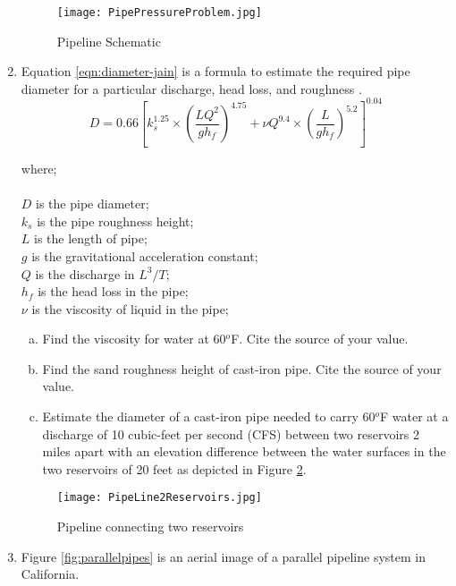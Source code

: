 \documentclass[12pt]{article}
\newcommand\tab[1][1cm]{\hspace*{#1}}
\begin{document}
\begin{enumerate}
\begin{figure}[htbp] %
   \centering
   \texttt{[image: PipePressureProblem.jpg]} 
   \caption{Pipeline Schematic}
   \label{fig:PipePressureProblem}
\end{figure}
\clearpage
\item 
Equation \ref{eqn:diameter-jain} is a formula to estimate the required pipe diameter for a particular discharge, head loss, and roughness \citep{jain1976}.
\begin{equation}
D=0.66[k_s^{1.25}\times(\frac{LQ^2}{gh_f})^{4.75}+\nu Q^{9.4}\times(\frac{L}{gh_f})^{5.2}]^{0.04}
\label{eqn:diameter-jain}
\end{equation}

where;\\~\\
\tab $D$ is the pipe diameter; \\
\tab $k_s$ is the pipe roughness height; \\
\tab $L$ is the length of pipe; \\
\tab $g$ is the gravitational acceleration constant; \\
\tab $Q$ is the discharge in $L^3/T$;\\
\tab $h_f$ is the head loss in the pipe; \\
\tab $\nu$ is the viscosity of liquid in the pipe; \\ 

\begin{enumerate}[(a)]
\item Find the viscosity for water at 60$^o$F.  Cite the source of your value.
\item Find the sand roughness height of cast-iron pipe.  Cite the source of your value. 
\item Estimate the diameter of a cast-iron pipe needed to carry 60$^o$F water at a discharge of 10 cubic-feet per second (CFS) between two reservoirs 2 miles apart with an elevation difference between the water surfaces in the two reservoirs of 20 feet as depicted in Figure \ref{fig:PipeLine2Reservoirs}.
\end{enumerate}

\begin{figure}[htbp] %
   \centering
   \texttt{[image: PipeLine2Reservoirs.jpg]} 
   \caption{Pipeline connecting two reservoirs}
   \label{fig:PipeLine2Reservoirs}
\end{figure}
\clearpage
\item Figure \ref{fig:parallelpipes} is an aerial image of a parallel pipeline system in California.   


\end{enumerate}
\end{document}
